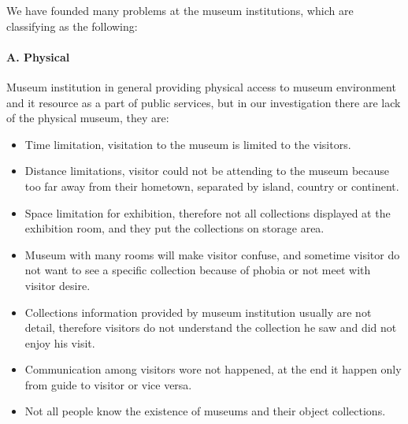 We have founded many problems at the museum institutions, which are classifying as the following:

\paragraph{A. Physical} Museum institution in general providing physical access to museum environment and it resource as a part of public services, but in our investigation there are lack of the physical museum, they are:
\begin{itemize}
	\item Time limitation, visitation to the museum is limited to the visitors.
	\item Distance limitations, visitor could not be attending to the museum because too far away from their hometown, separated by island, country or continent.
	\item Space limitation for exhibition, therefore not all collections displayed at the exhibition room, and they put the collections on storage area.
	\item Museum with many rooms will make visitor confuse, and sometime visitor do not want to see a specific collection because of phobia or not meet with visitor desire.
	\item Collections information provided by museum institution usually are not detail, therefore visitors do not understand the collection he saw and did not enjoy his visit.
	\item Communication among visitors wore not happened, at the end it happen only from guide to visitor or vice versa.
	\item Not all people know the existence of museums and their object collections.
\end{itemize}

